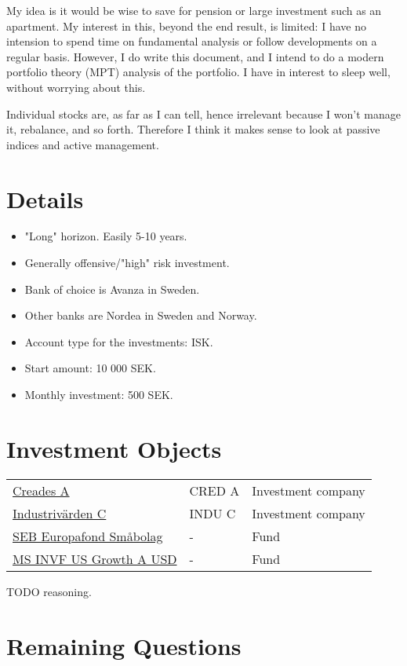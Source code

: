 \documentclass[A4]{article}
\title{\documenttitle}
\date{\today}
\author{Frans Englich \\
        \href{mailto:fenglich@fastmail.fm}{fenglich@fastmail.fm}}
\begin{document}
\maketitle

My idea is it would be wise to save for pension or large investment such as an apartment. My interest in this, beyond the end result, is limited: I have no intension to spend time on fundamental analysis or follow developments on a regular basis. However, I do write this document, and I intend to do a modern portfolio theory (MPT) analysis of the portfolio. I have in interest to sleep well, without worrying about this.

Individual stocks are, as far as I can tell, hence irrelevant because I won't manage it, rebalance, and so forth. Therefore I think it makes sense to look at passive indices and active management.

\section{Details}

\begin{itemize}
\item "Long" horizon. Easily 5-10 years.
\item Generally offensive/"high" risk investment.
\item Bank of choice is Avanza in Sweden.
\item Other banks are Nordea in Sweden and Norway.
\item Account type for the investments: ISK.
\item Start amount: 10 000 SEK.
\item Monthly investment: 500 SEK.
\end{itemize}

\section{Investment Objects}

\begin{center}
\begin{tabular}{ |l|l|l| }
 \hline
    \href{https://www.avanza.se/aktier/omc-aktien.html/338588/creades-a}{Creades A} & CRED A & Investment company \\
    \href{https://www.avanza.se/aktier/om-aktien.html/5245/industrivarden-c}{Industrivärden C} & INDU C & Investment company \\
    \href{https://www.avanza.se/fonder/om-fonden.html/929/seb-europafond-smabolag}{SEB Europafond Småbolag} & - & Fund \\
    \href{https://www.avanza.se/fonder/om-fonden.html/70331/ms-invf-us-growth-a-usd}{MS INVF US Growth A USD} & - & Fund \\
 \hline
\end{tabular}
\end{center}

TODO reasoning.

\section{Remaining Questions}
\end{document}
